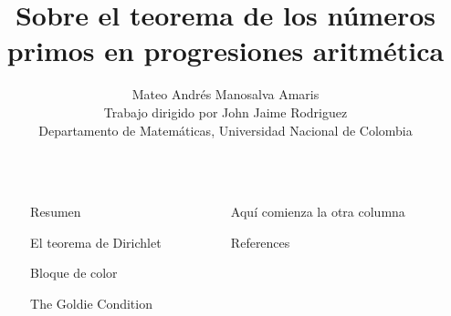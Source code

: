 \documentclass[final]{beamer}
\title{Sobre el teorema de los números primos en progresiones aritmética}
\author{Mateo Andrés Manosalva Amaris\\Trabajo dirigido por John Jaime Rodriguez\\Departamento de Matemáticas, Universidad Nacional de Colombia}
\institute[shortinst]{\texttt{mmanosalva@unal.edu.co}}
\newlength{\sepwidth}
\newlength{\colwidth}
\newcommand{\separatorcolumn}{\begin{column}{\sepwidth}\end{column}}
\begin{document}
\begin{frame}[t, fragile]
\begin{columns}[t]
\separatorcolumn

\begin{column}{\colwidth}

  \begin{block}{Resumen}

\lipsum[1]

  \end{block}

\begin{block}{El teorema de Dirichlet}
    \lipsum[2]
\end{block}
    
  \begin{alertblock}{Bloque de color}

    \lipsum[1-5] 
  \end{alertblock}

 \begin{block}{The Goldie Condition}
    \lipsum[1-4]
  \end{block}

\end{column}

\separatorcolumn

\begin{column}{\colwidth}
  \begin{block}{Aquí comienza la otra columna}
    \lipsum[1-4]
  \end{block}
  
  

 

  \begin{block}{References}

    \nocite{*}
    \footnotesize{}

  \end{block}

\end{column}
\separatorcolumn



\end{columns}
\end{frame}
\end{document}
